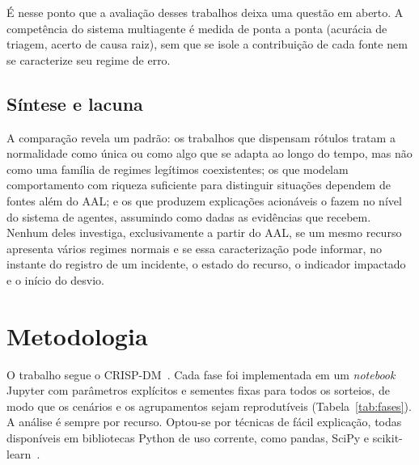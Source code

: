 \documentclass[sigconf,nonacm]{acmart}
\begin{document}
É nesse ponto que a avaliação desses trabalhos deixa uma questão em aberto. A competência do sistema multiagente é medida de ponta a ponta (acurácia de triagem, acerto de causa raiz), sem que se isole a contribuição de cada fonte nem se caracterize seu regime de erro. 

\subsection{Síntese e lacuna}
A comparação revela um padrão: os trabalhos que dispensam rótulos tratam a normalidade como única ou como algo que se adapta ao longo do tempo, mas não como uma família de regimes legítimos coexistentes; os que modelam comportamento com riqueza suficiente para distinguir situações dependem de fontes além do AAL; e os que produzem explicações acionáveis o fazem no nível do sistema de agentes, assumindo como dadas as evidências que recebem. Nenhum deles investiga, exclusivamente a partir do AAL, se um mesmo recurso apresenta vários regimes normais e se essa caracterização pode informar, no instante do registro de um incidente, o estado do recurso, o indicador impactado e o início do desvio.

\section{Metodologia}\label{sec:metodologia}

O trabalho segue o CRISP-DM~\citep{chapman2000crispdm,wirth2000crispdm}. Cada fase foi implementada em um \emph{notebook} Jupyter com parâmetros explícitos e sementes fixas para todos os sorteios, de modo que os cenários e os agrupamentos sejam reprodutíveis (Tabela~\ref{tab:fases}). A análise é sempre por recurso. Optou-se por técnicas de fácil explicação, todas disponíveis em bibliotecas Python de uso corrente, como pandas, SciPy e scikit-learn~\citep{pedregosa2011sklearn}.
\end{document}
